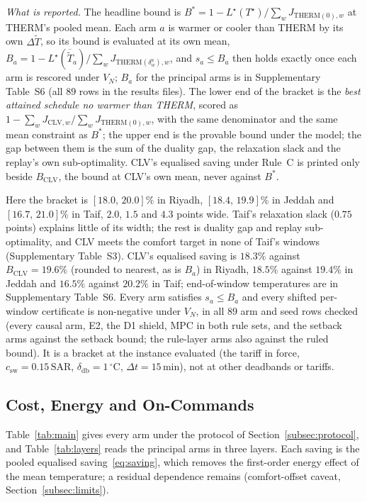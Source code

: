 \documentclass[3p,twocolumn,number]{elsarticle}
\newcommand{\deadband}{\delta_{\mathrm{db}}}
\newcommand{\csw}{c_{\mathrm{sw}}}
\newcommand{\SAR}{\text{SAR}}
\begin{document}
\emph{What is reported.} The headline bound is $B^{\ast}=1-L^{\star}(T^{\star})/\sum_wJ_{\mathrm{THERM}(0),w}$ at THERM's pooled mean. Each arm $a$ is warmer or cooler than THERM by its own $\Delta\tilde T$, so its bound is evaluated at its own mean, $B_a=1-L^{\star}(\overline{\tilde T}_a)/\sum_wJ_{\mathrm{THERM}(\delta^a_w),w}$, and $s_a\le B_a$ then holds exactly once each arm is rescored under $V_N$; $B_a$ for the principal arms is in Supplementary Table~S6 (all $89$ rows in the results files). The lower end of the bracket is the \emph{best attained schedule no warmer than THERM}, scored as $1-\sum_wJ_{\mathrm{CLV},w}/\sum_wJ_{\mathrm{THERM}(0),w}$, with the same denominator and the same mean constraint as $B^{\ast}$; the upper end is the provable bound under the model; the gap between them is the sum of the duality gap, the relaxation slack and the replay's own sub-optimality. CLV's equalised saving under Rule~C is printed only beside $B_{\mathrm{CLV}}$, the bound at CLV's own mean, never against $B^{\ast}$.

Here the bracket is $[18.0,\,20.0]\%$ in Riyadh, $[18.4,\,19.9]\%$ in Jeddah and $[16.7,\,21.0]\%$ in Taif, $2.0$, $1.5$ and $4.3$ points wide. Taif's relaxation slack ($0.75$ points) explains little of its width; the rest is duality gap and replay sub-optimality, and CLV meets the comfort target in none of Taif's windows (Supplementary Table~S3). CLV's equalised saving is $18.3\%$ against $B_{\mathrm{CLV}}=19.6\%$ (rounded to nearest, as is $B_a$) in Riyadh, $18.5\%$ against $19.4\%$ in Jeddah and $16.5\%$ against $20.2\%$ in Taif; end-of-window temperatures are in Supplementary Table~S6. Every arm satisfies $s_a\le B_a$ and every shifted per-window certificate is non-negative under $V_N$, in all $89$ arm and seed rows checked (every causal arm, E2, the D1 shield, MPC in both rule sets, and the setback arms against the setback bound; the rule-layer arms also against the ruled bound). It is a bracket at the instance evaluated (the tariff in force, $\csw=0.15\,\SAR$, $\deadband=1\,^\circ$C, $\Delta t=15\,$min), not at other deadbands or tariffs.

\subsection{Cost, Energy and On-Commands}
\label{subsec:consumption}

Table~\ref{tab:main} gives every arm under the protocol of Section~\ref{subsec:protocol}, and Table~\ref{tab:layers} reads the principal arms in three layers. Each saving is the pooled equalised saving~\eqref{eq:saving}, which removes the first-order energy effect of the mean temperature; a residual dependence remains (comfort-offset caveat, Section~\ref{subsec:limits}).
\end{document}
